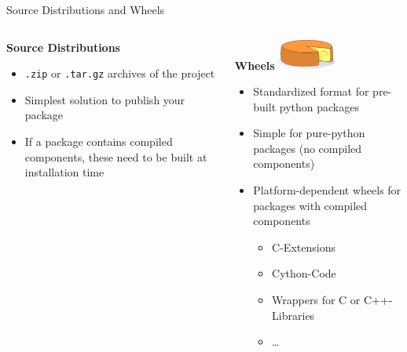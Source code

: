 \documentclass[
  aspectratio=1610,
]{beamer}
\begin{document}
\begin{frame}[c]{Source Distributions and Wheels}

  \begin{columns}[onlytextwidth, t]%
    \begin{column}{0.495\textwidth}%
      \textbf{\Large Source Distributions}
      \begin{itemize}
        \item \texttt{.zip} or \texttt{.tar.gz} archives of the project
        \item Simplest solution to publish your package
        \item If a package contains compiled components, these need to be built at installation time
      \end{itemize}
    \end{column}%
    \hfill%
    \begin{column}{0.495\textwidth}%
      \textbf{\Large Wheels} \includegraphics[height=1cm]{images/cheese.png}
      \begin{itemize}
        \item Standardized format for pre-built python packages
        \item Simple for pure-python packages (no compiled components)
        \item Platform-dependent wheels for packages with compiled components
          \begin{itemize}
            \item C-Extensions
            \item Cython-Code
            \item Wrappers for C or C++-Libraries
            \item \dots
          \end{itemize}
      \end{itemize}
    \end{column}%
  \end{columns}%
\end{frame}
\end{document}
